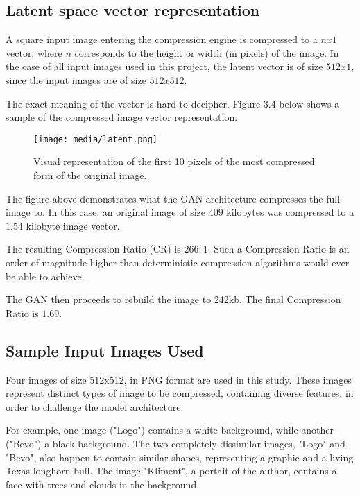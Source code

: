 \subsection{Latent space vector representation}

A square input image entering the compression engine is compressed to a $nx1$ vector, where $n$ corresponds to the height or width (in pixels)
of the image. In the case of all input images used in this project, the latent vector
is of size $512x1$, since the input images are of size $512x512$.

The exact meaning of the vector is hard to decipher. Figure 3.4 below shows a sample of the compressed image vector representation:

\begin{figure}[H]
	\begin{center}
	\texttt{[image: media/latent.png]}
	\end{center}
	\caption[Latent Space Representation]{Visual representation of the first 10 pixels of the most compressed form of the original image.}
	\end{figure}

The figure above demonstrates what the GAN architecture compresses the full image to. In this case, an original image 
of size $409$ kilobytes was compressed to a $1.54$ kilobyte image vector. 

The resulting Compression Ratio (CR) is $266:1$.
Such a Compression Ratio is an order of magnitude higher than deterministic compression algorithms would ever be able to achieve. 
\citep{Principles}

The GAN then proceeds to rebuild the image to 242kb. The final Compression Ratio is $1.69$.
\subsection{Sample Input Images Used}

Four images of size 512x512, in PNG format are used in this study.
These images represent distinct types of image to be compressed, containing 
diverse features, in order to challenge the model architecture.

For example, one image ("Logo") contains a white background, while another ("Bevo") a black background.
The two completely dissimilar images, "Logo" and "Bevo", also happen to contain similar shapes, representing a graphic and a living
Texas longhorn bull.
The image "Kliment", a portait of the author, contains a face with trees and clouds in the background.

